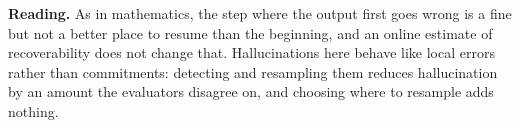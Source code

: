 \textbf{Reading.} As in mathematics, the step where the output first goes wrong is a fine but not a
better place to resume than the beginning, and an online estimate of recoverability does not
change that. Hallucinations here behave like local errors rather than commitments:
detecting and resampling them reduces hallucination by an amount the evaluators disagree on, and
choosing where to resample adds nothing.
